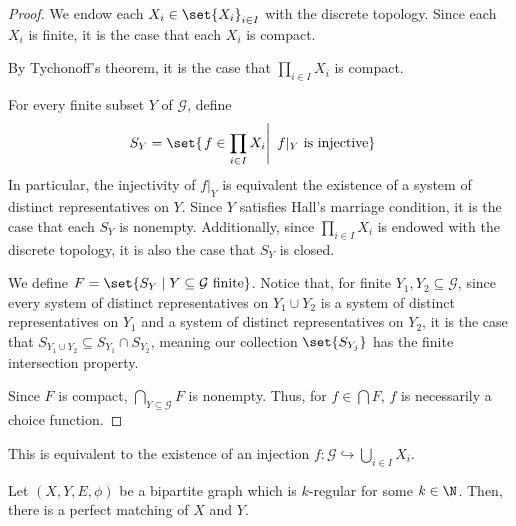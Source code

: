 \documentclass[10pt]{mypackage}
\begin{document}
  \begin{proof}
    We endow each $X_i\in \set{X_i}_{i\in I}$ with the discrete topology. Since each $X_i$ is finite, it is the case that each $X_i$ is compact.\newline

    By Tychonoff's theorem, it is the case that $\prod_{i\in I}X_i$ is compact.\newline

    For every finite subset $Y$ of $\mathcal{G}$, define
    \begin{align*}
      S_Y &= \set{\left. f\in \prod_{i\in I}X_i \right|~f\vert_{Y}\text{ is injective}}
    \end{align*}
    In particular, the injectivity of $f\vert_{Y}$ is equivalent the existence of a system of distinct representatives on $Y$. Since $Y$ satisfies Hall's marriage condition, it is the case that each $S_Y$ is nonempty. Additionally, since $\prod_{i\in I}X_i$ is endowed with the discrete topology, it is also the case that $S_Y$ is closed.\newline

    We define $F = \set{S_Y\mid Y\subseteq \mathcal{G}\text{ finite}}$. Notice that, for finite $Y_1,Y_2\subseteq \mathcal{G}$, since every system of distinct representatives on $Y_1\cup Y_2$ is a system of distinct representatives on $Y_1$ and a system of distinct representatives on $Y_2$, it is the case that $S_{Y_1\cup Y_2}\subseteq S_{Y_1}\cap S_{Y_2}$, meaning our collection $\set{S_{Y_j}}$ has the finite intersection property. \newline

    Since $F$ is compact, $\bigcap_{Y\subseteq \mathcal{G}} F$ is nonempty. Thus, for $f\in \bigcap F$, $f$ is necessarily a choice function. 
  \end{proof}
  \begin{remark}
    This is equivalent to the existence of an injection $f: \mathcal{G}\hookrightarrow \bigcup_{i\in I}X_i$.
  \end{remark}
  \begin{theorem}
    Let $(X,Y,E,\phi)$ be a bipartite graph which is $k$-regular for some $k\in\N$. Then, there is a perfect matching of $X$ and $Y$.
  \end{theorem}
\end{document}
